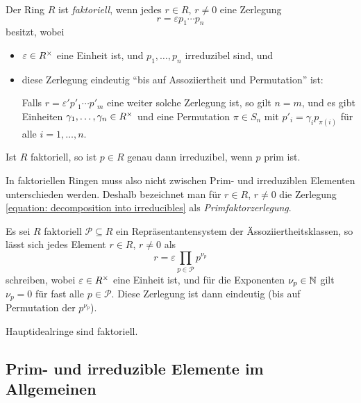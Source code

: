 \begin{definition}
\label{definition: ufd}
  Der Ring $R$ ist \emph{faktoriell}, wenn jedes $r \in R$, $r \neq 0$ eine Zerlegung
  \begin{equation}
  \label{equation: decomposition into irreducibles}
    r = \varepsilon p_1 \dotsm p_n
  \end{equation}
  besitzt, wobei
  \begin{itemize}
    \item
      $\varepsilon \in R^{\times}$ eine Einheit ist, und $p_1, \dotsc, p_n$ irreduzibel sind, und
    \item
      diese Zerlegung eindeutig \enquote{bis auf Assoziiertheit und Permutation} ist:
      
      Falls $r = \varepsilon' p'_1 \dotsm p'_m$ eine weiter solche Zerlegung ist, so gilt $n = m$, und es gibt Einheiten $\gamma_1, \dotsc, \gamma_n \in R^{\times}$ und eine Permutation $\pi \in S_n$ mit $p'_i = \gamma_i p_{\pi(i)}$ für alle $i = 1, \dotsc, n$.
  \end{itemize}
\end{definition}

\begin{lemma}
  Ist $R$ faktoriell, so ist $p \in R$ genau dann irreduzibel, wenn $p$ prim ist.
\end{lemma}

In faktoriellen Ringen muss also nicht zwischen Prim- und irreduziblen Elementen unterschieden werden.
Deshalb bezeichnet man für $r \in R$, $r \neq 0$ die Zerlegung \eqref{equation: decomposition into irreducibles} als \emph{Primfaktorzerlegung}.

\begin{remark}
  Es sei $R$ faktoriell $\mathcal{P} \subseteq R$ ein Repräsentantensystem der Ässoziiertheitsklassen, so lässt sich jedes Element $r \in R$, $r \neq 0$ als
  \[
    r = \varepsilon \prod_{p \in \mathcal{P}} p^{\nu_p}
  \]
  schreiben, wobei $\varepsilon \in R^{\times}$ eine Einheit ist, und für die Exponenten $\nu_p \in \mathbb{N}$ gilt $\nu_p = 0$ für fast alle $p \in \mathcal{P}$.
  Diese Zerlegung ist dann eindeutig (bis auf Permutation der $p^{\nu_p}$).
\end{remark}


\begin{proposition}
  Hauptidealringe sind faktoriell.
\end{proposition}



\subsection{Prim- und irreduzible Elemente im Allgemeinen}

